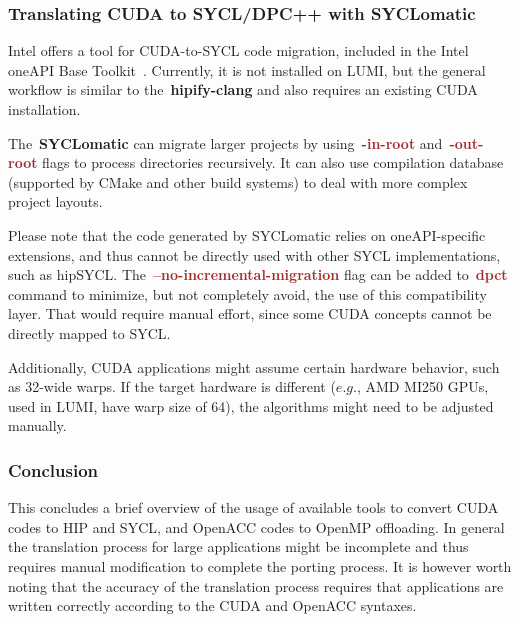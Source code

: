 \subsubsection{Translating CUDA to SYCL/DPC++ with SYCLomatic}


\par
Intel offers a tool for CUDA-to-SYCL code migration, included in the Intel oneAPI Base Toolkit~\cite{intel_oneapi_base_toolkit}.
Currently, it is not installed on LUMI, but the general workflow is similar to the~\textbf{hipify-clang} and also requires an existing CUDA installation.



\par
The~\textbf{SYCLomatic} can migrate larger projects by using~\textbf{\textcolor{brown}{-in-root}} and~\textbf{\textcolor{brown}{-out-root}} flags to process directories recursively.
It can also use compilation database (supported by CMake and other build systems) to deal with more complex project layouts.


\par
Please note that the code generated by SYCLomatic relies on oneAPI-specific extensions, and thus cannot be directly used with other SYCL implementations, such as hipSYCL.
The~\textbf{\textcolor{brown}{--no-incremental-migration}} flag can be added to~\textbf{\textcolor{brown}{dpct}} command to minimize, but not completely avoid, the use of this compatibility layer.
That would require manual effort, since some CUDA concepts cannot be directly mapped to SYCL.


\par
Additionally, CUDA applications might assume certain hardware behavior, such as 32-wide warps.
If the target hardware is different ($e.g.$, AMD MI250 GPUs, used in LUMI, have warp size of 64), the algorithms might need to be adjusted manually.


\subsubsection{Conclusion}


\par
This concludes a brief overview of the usage of available tools to convert CUDA codes to HIP and SYCL, and OpenACC codes to OpenMP offloading.
In general the translation process for large applications might be incomplete and thus requires manual modification to complete the porting process.
It is however worth noting that the accuracy of the translation process requires that applications are written correctly according to the CUDA and OpenACC syntaxes.


